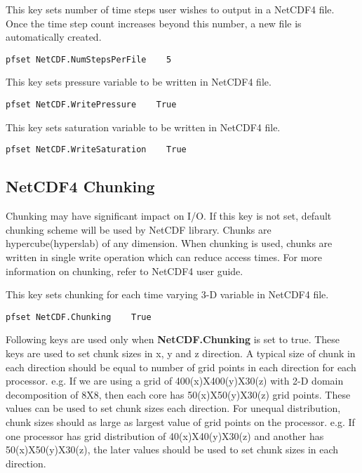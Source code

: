 {This key sets number of time steps user wishes to output in a NetCDF4 file. Once the time step count increases beyond this number, a new file is automatically created.} 
\begin{display}\begin{verbatim}
pfset NetCDF.NumStepsPerFile    5
\end{verbatim}\end{display}

{This key sets pressure variable to be written in NetCDF4 file.} 
\begin{display}\begin{verbatim}
pfset NetCDF.WritePressure    True
\end{verbatim}\end{display}

{This key sets saturation variable to be written in NetCDF4 file.} 
\begin{display}\begin{verbatim}
pfset NetCDF.WriteSaturation    True
\end{verbatim}\end{display}

\subsection{NetCDF4 Chunking}
Chunking may have significant impact on I/O. If this key is not set, default chunking scheme will be used by NetCDF library. Chunks are hypercube(hyperslab) of any dimension. When chunking is used, chunks are written in single write operation which can reduce access times. For more information on chunking, refer to NetCDF4 user guide.

{This key sets chunking for each time varying 3-D variable in NetCDF4 file.} 
\begin{display}\begin{verbatim}
pfset NetCDF.Chunking    True
\end{verbatim}\end{display}

Following keys are used only when \textbf{NetCDF.Chunking} is set to true. These keys are used to set chunk sizes in x, y and z direction. A typical size of chunk in each direction should be equal to number of grid points in each direction for each processor. e.g. If we are using a grid of 400(x)X400(y)X30(z) with 2-D domain decomposition of 8X8, then each core has 50(x)X50(y)X30(z) grid points. These values can be used to set chunk sizes each direction. For unequal distribution, chunk sizes should as large as largest value of grid points on the processor. e.g. If one processor has grid distribution of 40(x)X40(y)X30(z) and another has 50(x)X50(y)X30(z), the later values should be used to set chunk sizes in each direction.
 

